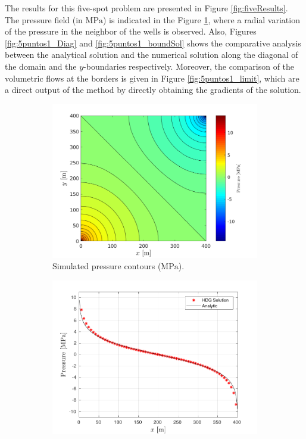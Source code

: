 \documentclass[review]{elsarticle}
\begin{document}
The results for this five-spot problem are presented in Figure \ref{fig:fiveResults}. The pressure field (in $\mathrm{MPa}$) is indicated in the Figure \ref{fig:5puntos2}, where a radial variation of the pressure in the neighbor of the wells is observed.  Also, Figures \ref{fig:5puntos1_Diag} and \ref{fig:5puntos1_boundSol} shows the comparative analysis between the analytical solution and the numerical solution along the diagonal of the domain and the $y$-boundaries respectively. Moreover, the comparison of the volumetric flows at the borders is given in Figure \ref{fig:5puntos1_limit}, which are a direct output of the method by directly obtaining the gradients of the solution.

\begin{figure}[H]
	\begin{subfigure}[b]{0.5\textwidth}
		\includegraphics[width=1.0\textwidth]{./Figures/Examples/FiveSpot/5puntos2sol_2}
		\caption[Test geometry 1]{Simulated pressure contours ($\mathrm{MPa}$).}
		\label{fig:5puntos2}
	\end{subfigure}\quad
	\begin{subfigure}[b]{0.5\textwidth}
	\includegraphics[width=1\textwidth]{./Figures/Examples/FiveSpot/5spot1_Diagonal.pdf}

\end{subfigure}
\end{figure}
\end{document}
